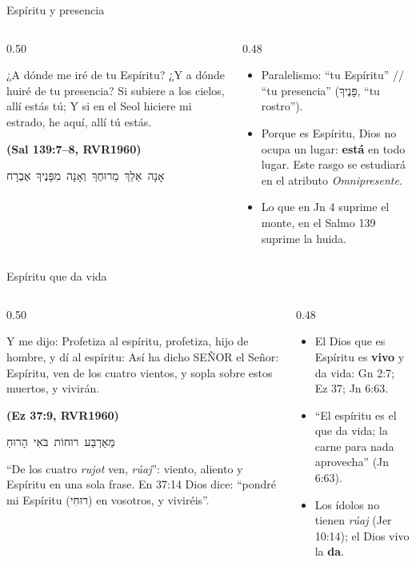 \documentclass[hyperref={bookmarks=false},aspectratio=169]{beamer}
\newcommand{\heb}[1]{\mbox{\foreignlanguage{hebrew}{#1}}}
\newcommand{\SENOR}{S{\fontsize{0.78em}{1em}\selectfont EÑOR}}
\newcommand{\fuente}[1]{\par\hfill{\upshape\bfseries\footnotesize\textcolor{azul}{#1}}}
\newcommand{\destacar}[1]{\textbf{\textcolor{azul}{#1}}}
\begin{document}
\begin{frame}{Espíritu y presencia}
\begin{columns}[c,onlytextwidth]
\begin{column}{0.50\textwidth}
\begin{cita}¿A dónde me iré de tu Espíritu? ¿Y a dónde huiré de tu presencia? Si subiere a los cielos, allí estás tú; Y si en el Seol hiciere mi estrado, he aquí, allí tú estás.\fuente{(Sal 139:7--8, RVR1960)}\end{cita}
\begin{center}\heb{אָנָה אֵלֵךְ מֵרוּחֶךָ וְאָנָה מִפָּנֶיךָ אֶבְרָח}\end{center}
\end{column}
\begin{column}{0.48\textwidth}\small
\begin{itemize}
\item Paralelismo: ``tu Espíritu'' // ``tu presencia'' (\heb{פָּנֶיךָ}, ``tu rostro'').
\item Porque es Espíritu, Dios no ocupa un lugar: \destacar{está} en todo lugar. Este rasgo se estudiará en el atributo \emph{Omnipresente}.
\item Lo que en Jn 4 suprime el monte, en el Salmo 139 suprime la huida.
\end{itemize}
\end{column}
\end{columns}
\end{frame}

\begin{frame}{Espíritu que da vida}
\begin{columns}[t,onlytextwidth]
\begin{column}{0.50\textwidth}
\begin{cita}Y me dijo: Profetiza al espíritu, profetiza, hijo de hombre, y dí al espíritu: Así ha dicho \SENOR{} el Señor: Espíritu, ven de los cuatro vientos, y sopla sobre estos muertos, y vivirán.\fuente{(Ez 37:9, RVR1960)}\end{cita}
\begin{center}\heb{מֵאַרְבַּע רוּחוֹת בֹּאִי הָרוּחַ}\end{center}
\scriptsize ``De los cuatro \emph{rujot} ven, \emph{rúaj}'': viento, aliento y Espíritu en una sola frase. En 37:14 Dios dice: ``pondré mi Espíritu (\heb{רוּחִי}) en vosotros, y viviréis''.
\end{column}
\begin{column}{0.48\textwidth}\small
\begin{itemize}
\item El Dios que es Espíritu es \destacar{vivo} y da vida: Gn 2:7; Ez 37; Jn 6:63.
\item ``El espíritu es el que da vida; la carne para nada aprovecha'' (Jn 6:63).
\item Los ídolos no tienen \emph{rúaj} (Jer 10:14); el Dios vivo la \destacar{da}.
\end{itemize}
\end{column}
\end{columns}
\end{frame}
\end{document}
